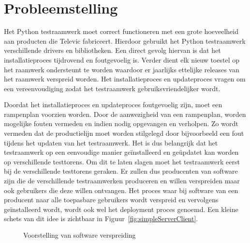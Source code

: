 
\section{Probleemstelling}\label{sec:probleem}
Het Python testraamwerk moet correct functioneren met een grote hoeveelheid aan producten die Televic fabriceert.
Hierdoor gebruikt het Python testraamwerk verschillende drivers en bibliotheken.
Een direct gevolg hiervan is dat het installatieproces tijdrovend en foutgevoelig is.
Verder dient elk nieuw toestel op het raamwerk ondersteunt te worden waardoor er jaarlijks ettelijke releases van het raamwerk verspreid worden.
Het installatieproces en updateproces vragen om een vereenvoudiging zodat het testraamwerk gebruiksvriendelijker wordt.

Doordat het installatieproces en updateproces foutgevoelig zijn, moet een rampenplan voorzien worden.
Door de aanwezigheid van een rampenplan, worden mogelijke fouten vermeden en indien nodig opgevangen en verholpen.
Zo wordt vermeden dat de productielijn moet worden stilgelegd door bijvoorbeeld een fout tijdens het updaten van het testraamwerk.
Het is dus belangrijk dat het testraamwerk op een eenvoudige manier geïnstalleerd en geüpdatet kan worden op verschillende testtorens.
Om dit te laten slagen moet het testraamwerk eerst bij de verschillende testtorens geraken.
Er zullen dus producenten van software zijn die de verschillende testraamwerken produceren en willen verspreiden maar ook gebruikers die deze willen ontvangen.
Het proces waar bij software van een producent naar alle toepasbare gebruikers wordt verspreid en vervolgens geïnstalleerd wordt, wordt ook wel het deployment proces genoemd.
Een kleine schets van dit idee is zichtbaar in Figuur~\vref{fig:simpleServerClient}.

\begin{figure}[!ht]
\centering
{}
\caption{Voorstelling van software verspreiding}
\label{fig:simpleServerClient}
\end{figure}


